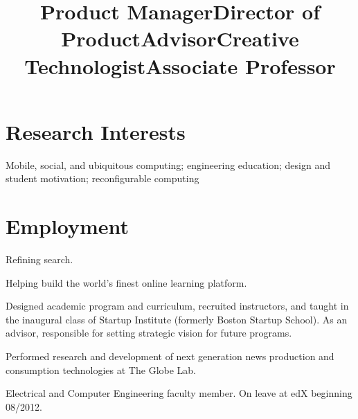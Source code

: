 \documentclass[line]{res}
\begin{document}
\begin{resume}
	\section{\sc Research Interests}
	
	Mobile, social, and ubiquitous computing; engineering education; design and student motivation; reconfigurable computing
	
	\section{\sc Employment}

	\title{Product Manager} 
	 
	\begin{position}
		Refining search.
	\end{position}

	\title{Director of Product} 
	 
	\begin{position}
		Helping build the world's finest online learning platform.
	\end{position}
	
	\title{Advisor} 
	 
	\begin{position}
		Designed academic program and curriculum, recruited instructors, and taught in the inaugural class of Startup Institute (formerly Boston Startup School). As an advisor, responsible for setting strategic vision for future programs.
	\end{position}
	
	\title{Creative Technologist} 
	  
	\begin{position}
		Performed research and development of next generation news production and consumption
    technologies at The Globe Lab.
	\end{position}
	
	\title{Associate Professor} 
	  
	\begin{position}
		Electrical and Computer Engineering faculty member. On leave at edX beginning 08/2012.
	\end{position}
	

\end{resume}
\end{document}
